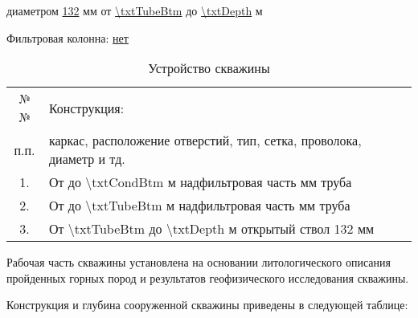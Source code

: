 	 диаметром \underline{132} мм от \underline{\num{\txtTubeBtm}} до \underline{\num{\txtDepth}} м 
    
    \bigskip
	
	Фильтровая колонна: \underline{нет}
	

\begin{table}[!h]
	\caption{Устройство скважины}
	\centering
	\begin{tabularx}{\textwidth}{|c|X|}
		\hline 
		№№ & Конструкция: \\ 
		п.п. & каркас, расположение отверстий, тип, сетка, проволока, диаметр и тд. \\ 
		\hline 
		1. & От {\txtOgolovok} до {\num{\txtCondBtm}} м   надфильтровая часть \diameter {\txtCondDiam} мм {\txtCondMaterial} труба \\ 
		\hline 
		2. & От {\txtOgolovok} до {\num{\txtTubeBtm}} м   надфильтровая часть \diameter {\txtTubeDiam} мм {\txtTubeMaterial} труба \\ 
		\hline 
		3. & От {\num{\txtTubeBtm}} до {\num{\txtDepth}} м   открытый ствол {\diameter} 132 мм \\ 
		\hline 
	\end{tabularx} 
\end{table}


Рабочая часть скважины установлена на основании литологического описания пройденных горных пород и результатов геофизического исследования скважины.

\newpage

Конструкция и глубина сооруженной скважины приведены в следующей таблице:

